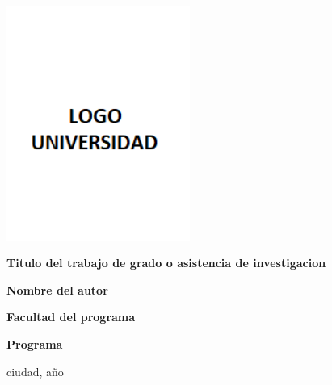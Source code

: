 \begin{titlepage}
	\centering
	\includegraphics[width=6cm]{figures/logo_universidad.png}\par \vspace{2cm}
	{\textbf{\LARGE Titulo del trabajo de grado o asistencia de investigacion} \par}
	\vspace{7cm}
	{\Large \textbf{Nombre del autor} \par}
	\vfill %
	{\normalsize \textbf{Facultad del programa} \par}
	{\normalsize \textbf{Programa } \par}
	{\normalsize ciudad, año \par}
\end{titlepage}